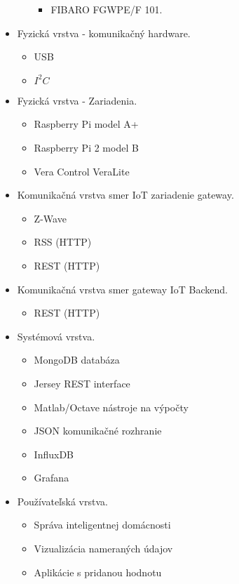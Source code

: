 \begin{itemize}
\begin{itemize}
\begin{itemize}
        \item FIBARO FGWPE/F 101.         
       \end{itemize}     
  \end{itemize}  
\item Fyzická vrstva - komunikačný hardware.
  \begin{itemize}
    \item USB
    \item $I^2C$
  \end{itemize}    
\item Fyzická vrstva - Zariadenia.
  \begin{itemize}
    \item Raspberry Pi model A+
    \item Raspberry Pi 2 model B    
    \item Vera Control VeraLite
  \end{itemize}  
\item Komunikačná vrstva smer IoT zariadenie gateway.
  \begin{itemize}
    \item Z-Wave
    \item RSS (HTTP)
    \item REST (HTTP)    
  \end{itemize}    
\item Komunikačná vrstva smer gateway IoT Backend.
  \begin{itemize}
    \item REST (HTTP)
  \end{itemize} 
\item Systémová vrstva.
  \begin{itemize}
    \item MongoDB databáza 
    \item Jersey REST interface
    \item Matlab/Octave  nástroje na výpočty     
    \item JSON komunikačné rozhranie
    \item InfluxDB
    \item Grafana
  \end{itemize}           
\item Používateľská vrstva.
  \begin{itemize}
    \item Správa inteligentnej domácnosti
    \item Vizualizácia nameraných údajov 
    \item Aplikácie s pridanou hodnotu 
  \end{itemize}         
\end{itemize}
